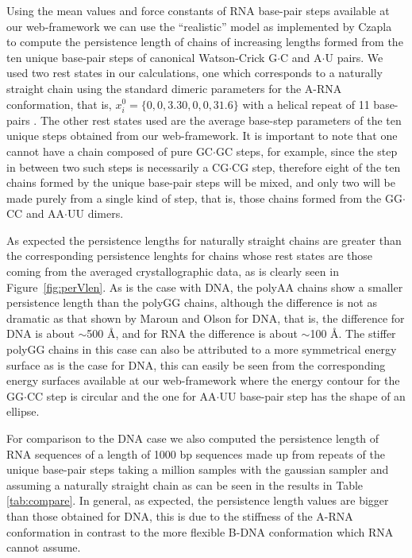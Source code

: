 Using  the mean  values and  force  constants of  RNA base-pair  steps
available at our  web-framework we can use the  ``realistic'' model as
implemented  by  Czapla~\cite{czapla2006}  to compute  the  persistence
length  of chains  of increasing  lengths formed  from the  ten unique
base-pair  steps  of canonical  Watson-Crick  G$\cdot$C and  A$\cdot$U
pairs.   We  used two  rest  states  in  our calculations,  one  which
corresponds to  a naturally straight chain using  the standard dimeric
parameters for  the A-RNA conformation,  that is, $x_{i}^{0} =  \{0, 0,
  3.30,  0,  0,  31.6\}$ with   a  helical  repeat  of  11  base-pairs
\cite{arnott1999}.   The  other  rest  states  used  are  the  average
base-step   parameters   of the ten unique steps obtained   from   our
web-framework. It is  important to  note that one  cannot have  a chain
composed of  pure GC$\cdot$GC  steps, for example,  since the  step in
between two  such steps is  necessarily a CG$\cdot$CG  step, therefore
eight of the  ten chains formed by the unique  base-pair steps will be
mixed, and  only two will be made  purely from a single  kind of step,
that  is, those  chains formed  from the  GG$\cdot$CC  and AA$\cdot$UU
dimers.

As expected the persistence  lengths for naturally straight chains are
greater  than the  corresponding persistence  lenghts for  chains whose
rest states are those  coming from the averaged crystallographic data,
as is  clearly seen in  Figure~\ref{fig:perVlen}. As is the  case with
DNA,  the polyAA  chains show  a smaller  persistence length  than the
polyGG  chains, although  the difference  is not  as dramatic  as that
shown by  Maroun and  Olson \cite{maroun1988a} for  DNA, that  is, the
difference for DNA is about  $\sim$500 \AA, and for RNA the difference
is about $\sim$100 \AA.  The stiffer polyGG chains in this case can
also be attributed to a more symmetrical energy surface as is the case
for  DNA,  this can  easily  be  seen  from the  corresponding  energy
surfaces available at our web-framework where the energy contour for
the GG$\cdot$CC step is circular and the one for AA$\cdot$UU base-pair
step has the shape of an ellipse.

For comparison to the DNA case we also computed the persistence length
of RNA sequences of a length of 1000 bp sequences made up from repeats
of  the unique  base-pair  steps  taking a  million  samples with  the
gaussian sampler  and assuming  a naturally straight  chain as  can be
seen  in  the results  in  Table  \ref{tab:compare}.   In general,  as
expected, the persistence length values are bigger than those obtained
for DNA,  this is due  to the stiffness  of the A-RNA  conformation in
contrast  to the  more flexible  B-DNA conformation  which  RNA cannot
assume.

